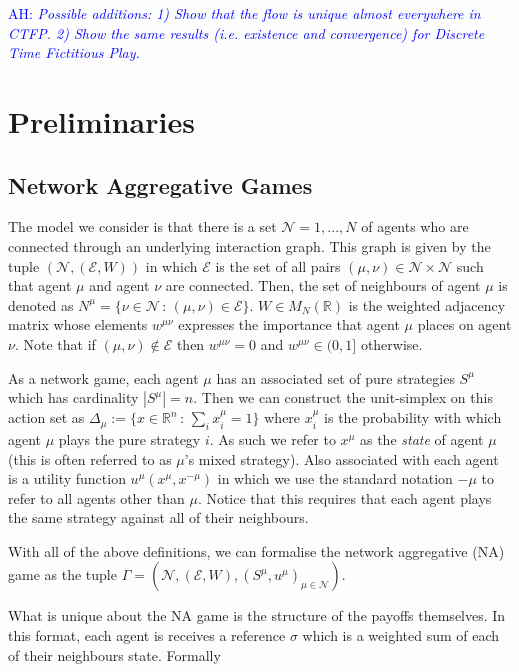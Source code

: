 \documentclass{article}
\theoremstyle{definition}
\newcommand{\ah}[1]{\textcolor{blue}{AH: \textit{#1}}}
\newcommand{\agentset}{\mathcal{N}}
\newcommand{\edgeset}{\mathcal{E}}
\newcommand{\weightset}{W}
\newcommand{\actionset}[1]{S^{#1}}
\newcommand{\utility}[1]{u^{#1}}
\newcommand{\wmunu}{w^{\mu \nu}}
\newcommand{\xmu}{x^{\mu}}
\newcommand{\xnotmu}{x^{-\mu}}
\newcommand{\xmuaction}[1]{x^{\mu}_{#1}}
\begin{document}
		\ah{Possible additions: 1) Show that the flow is unique almost everywhere in CTFP. 2) Show the same results (i.e. existence and convergence) for Discrete Time Fictitious Play.}
		\section{Preliminaries}
	\subsection{Network Aggregative Games}
	\label{sec::NAG}

	The model we consider is that there is a set $\agentset = {1, ... ,
	N}$ of agents who are connected through an underlying interaction graph. This graph is given by
	the tuple $(\agentset, (\edgeset, \weightset))$ in which $\edgeset$ is the set of all pairs $(\mu,
	\nu) \in \agentset \times \agentset$ such that agent $\mu$ and agent $\nu$ are connected. Then,
	the set of neighbours of agent $\mu$ is denoted as $N^\mu = \{\nu \in \agentset \, : \, (\mu,
	\nu) \in \edgeset\}$. $\weightset
	\in M_N(\mathbb{R})$ is the weighted adjacency matrix whose elements $w^{\mu \nu}$ expresses the
	importance that agent $\mu$ places on agent $\nu$. Note that if $(\mu, \nu) \not \in \edgeset$
	then $w^{\mu \nu} = 0$ and $\wmunu \in (0, 1]$ otherwise.

	As a network game, each agent $\mu$ has an associated set of pure strategies $\actionset{\mu}$
	which has cardinality $|\actionset{\mu}| = n$. Then we can construct the unit-simplex on this
	action set as $\Delta_\mu := \{x \in \mathbb{R}^n \, : \, \sum_i \xmuaction{i} = 1\}$ where
	$\xmuaction{i}$ is the probability with which agent $\mu$ plays the pure strategy $i$. As such
	we refer to $\xmu$ as the \emph{state} of agent $\mu$ (this is often referred to as $\mu$'s
	mixed strategy). Also associated with each agent is a utility function $u^\mu(\xmu, \xnotmu)$ in
	which we use the standard notation $-\mu$ to refer to all agents other than $\mu$. Notice that
	this requires that each agent plays the same strategy against all of their neighbours. 

	With all of the above definitions, we can formalise the network aggregative (NA) game as the tuple
	$\Gamma = (\agentset, (\edgeset, \weightset), (\actionset{\mu}, \utility{\mu})_{\mu \in \mathcal{N}})$.

	What is unique about the NA game is the structure of the payoffs themselves. In this format,
	each agent is receives a reference $\sigma$ which is a weighted sum of each of their
	neighbours state. Formally 
\end{document}
